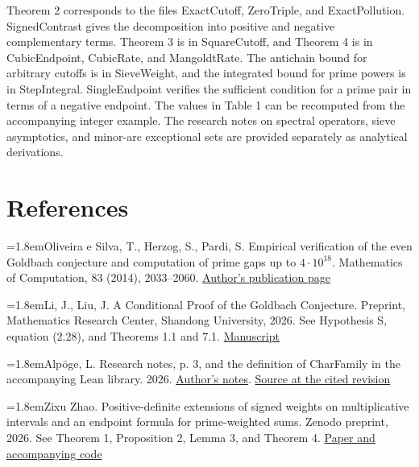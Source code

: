\documentclass[11pt,a4paper]{article}
\begin{document}
Theorem 2 corresponds to the files ExactCutoff, ZeroTriple, and ExactPollution. SignedContrast gives the decomposition into positive and negative complementary terms. Theorem 3 is in SquareCutoff, and Theorem 4 is in CubicEndpoint, CubicRate, and MangoldtRate. The antichain bound for arbitrary cutoffs is in SieveWeight, and the integrated bound for prime powers is in StepIntegral. SingleEndpoint verifies the sufficient condition for a prime pair in terms of a negative endpoint. The values in Table 1 can be recomputed from the accompanying integer example. The research notes on spectral operators, sieve asymptotics, and minor-arc exceptional sets are provided separately as analytical derivations.

\section*{References}
\begingroup\small

\par\smallskip\noindent\hangindent=1.8em\makebox[1.8em][l]{[1]}Oliveira e Silva, T., Herzog, S., Pardi, S. Empirical verification of the even Goldbach conjecture and computation of prime gaps up to $4\cdot10^{18}$. Mathematics of Computation, 83 (2014), 2033--2060. \href{https://sweet.ua.pt/tos/bib/4.12.html}{Author's publication page}

\par\smallskip\noindent\hangindent=1.8em\makebox[1.8em][l]{[2]}Li, J., Liu, J. A Conditional Proof of the Goldbach Conjecture. Preprint, Mathematics Research Center, Shandong University, 2026. See Hypothesis S, equation (2.28), and Theorems 1.1 and 7.1. \href{https://mrc.sdu.edu.cn/__local/6/14/8E/28753731EE31D7635BAF60732C2_0C644604_2CE958.pdf}{Manuscript}

\par\smallskip\noindent\hangindent=1.8em\makebox[1.8em][l]{[3]}Alpöge, L. Research notes, p. 3, and the definition of CharFamily in the accompanying Lean library. 2026. \href{https://alpo.ge/remark.pdf}{Author's notes}. \href{https://github.com/CocoSgt/riemann-hypothesis-lean/blob/7cbf7a0c32fca1badf05931879a37c3f8a2b03b4/src/Development/AutomorphicArithmetic/DedekindLFunctions/CharFamily.lean\#L9-L41}{Source at the cited revision}

\par\smallskip\noindent\hangindent=1.8em\makebox[1.8em][l]{[4]}Zixu Zhao. Positive-definite extensions of signed weights on multiplicative intervals and an endpoint formula for prime-weighted sums. Zenodo preprint, 2026. See Theorem 1, Proposition 2, Lemma 3, and Theorem 4. \href{https://doi.org/10.5281/zenodo.24439399}{Paper and accompanying code}
\end{document}
